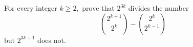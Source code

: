 For every integer $ k \geq 2,$ prove that $ 2^{3k}$ divides the number\[ \binom{2^{k + 1}}{2^{k}} - \binom{2^{k}}{2^{k - 1}}
\]
but $ 2^{3k + 1}$ does not.
